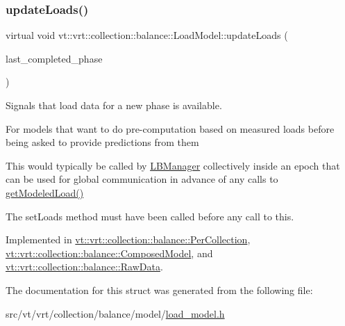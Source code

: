 \mbox{\label{structvt_1_1vrt_1_1collection_1_1balance_1_1_load_model_a4f1c6fb5d7d7a0b147755f025b1d5f5c}} 
\subsubsection{\texorpdfstring{update\+Loads()}{updateLoads()}}
{\footnotesize\ttfamily virtual void vt\+::vrt\+::collection\+::balance\+::\+Load\+Model\+::update\+Loads (\begin{DoxyParamCaption}\item[{\hyperlink{namespacevt_a46ce6733d5cdbd735d561b7b4029f6d7}{Phase\+Type}}]{last\+\_\+completed\+\_\+phase }\end{DoxyParamCaption})\hspace{0.3cm}{\ttfamily [pure virtual]}}



Signals that load data for a new phase is available. 

For models that want to do pre-\/computation based on measured loads before being asked to provide predictions from them

This would typically be called by \hyperlink{structvt_1_1vrt_1_1collection_1_1balance_1_1_l_b_manager}{L\+B\+Manager} collectively inside an epoch that can be used for global communication in advance of any calls to \hyperlink{structvt_1_1vrt_1_1collection_1_1balance_1_1_load_model_ac1e4cfe4bdacad8df0be7e1803390927}{get\+Modeled\+Load()}

The {\ttfamily set\+Loads} method must have been called before any call to this. 

Implemented in \hyperlink{structvt_1_1vrt_1_1collection_1_1balance_1_1_per_collection_a2b41fbbe2b684654f8dbfd9207b77501}{vt\+::vrt\+::collection\+::balance\+::\+Per\+Collection}, \hyperlink{classvt_1_1vrt_1_1collection_1_1balance_1_1_composed_model_ad8108b4392d63b7f09e443920a64933a}{vt\+::vrt\+::collection\+::balance\+::\+Composed\+Model}, and \hyperlink{structvt_1_1vrt_1_1collection_1_1balance_1_1_raw_data_a4aaae24a53ead0248b873911ce560a34}{vt\+::vrt\+::collection\+::balance\+::\+Raw\+Data}.



The documentation for this struct was generated from the following file\+:\begin{DoxyCompactItemize}
\item 
src/vt/vrt/collection/balance/model/\hyperlink{load__model_8h}{load\+\_\+model.\+h}\end{DoxyCompactItemize}
